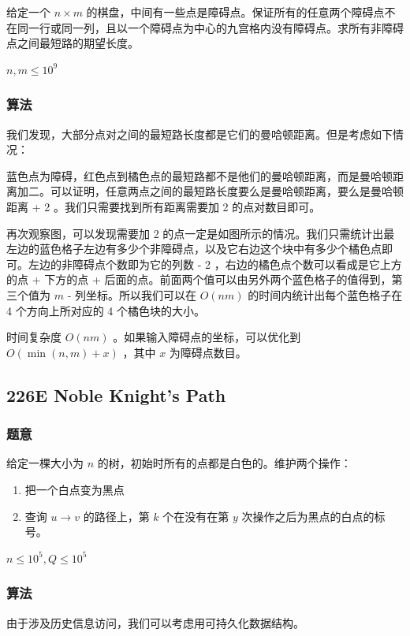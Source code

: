 \documentclass[11pt]{article}
\begin{document}
    给定一个 $n \times m$ 的棋盘，中间有一些点是障碍点。保证所有的任意两个障碍点不在同一行或同一列，且以一个障碍点为中心的九宫格内没有障碍点。求所有非障碍点之间最短路的期望长度。

    $n, m \leq 10^9$
\subsubsection{算法}
\label{sec-4-5-2}

    我们发现，大部分点对之间的最短路长度都是它们的曼哈顿距离。但是考虑如下情况：



    蓝色点为障碍，红色点到橘色点的最短路都不是他们的曼哈顿距离，而是曼哈顿距离加二。可以证明，任意两点之间的最短路长度要么是曼哈顿距离，要么是曼哈顿距离 + 2 。我们只需要找到所有距离需要加 2 的点对数目即可。

    再次观察图，可以发现需要加 2 的点一定是如图所示的情况。我们只需统计出最左边的蓝色格子左边有多少个非障碍点，以及它右边这个块中有多少个橘色点即可。左边的非障碍点个数即为它的列数 - 2 ，右边的橘色点个数可以看成是它上方的点 + 下方的点 + 后面的点。前面两个值可以由另外两个蓝色格子的值得到，第三个值为 $m$ - 列坐标。所以我们可以在 $O(nm)$ 的时间内统计出每个蓝色格子在 4 个方向上所对应的 4 个橘色块的大小。

    时间复杂度 $O(nm)$ 。如果输入障碍点的坐标，可以优化到 $O(\min (n, m) + x)$ ，其中 $x$ 为障碍点数目。
\subsection{226E  Noble Knight's Path}
\label{sec-4-6}
\subsubsection{题意}
\label{sec-4-6-1}

    给定一棵大小为 $n$ 的树，初始时所有的点都是白色的。维护两个操作：
\begin{enumerate}
\item 把一个白点变为黑点
\item 查询 $u \to v$ 的路径上，第 $k$ 个在没有在第 $y$ 次操作之后为黑点的白点的标号。
\end{enumerate}

    $n \leq 10^5, Q \leq 10^5$
\subsubsection{算法}
\label{sec-4-6-2}

    由于涉及历史信息访问，我们可以考虑用可持久化数据结构。
\end{document}
